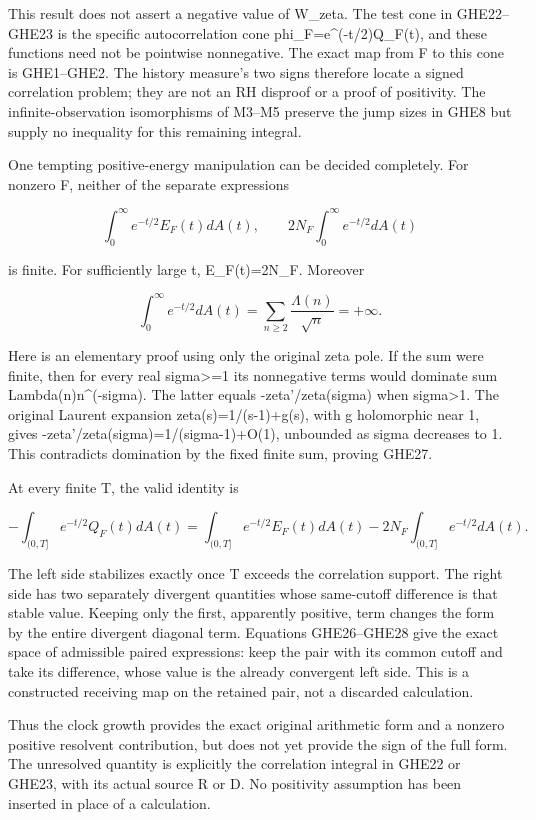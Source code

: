 This result does not assert a negative value of W\_zeta. The test cone
in GHE22--GHE23 is the specific autocorrelation cone
phi\_F=e\^{}(-t/2)Q\_F(t), and these functions need not be pointwise
nonnegative. The exact map from F to this cone is GHE1--GHE2. The
history measure's two signs therefore locate a signed correlation
problem; they are not an RH disproof or a proof of positivity. The
infinite-observation isomorphisms of M3--M5 preserve the jump sizes in
GHE8 but supply no inequality for this remaining integral.

One tempting positive-energy manipulation can be decided completely. For
nonzero F, neither of the separate expressions

\[
\int_0^\infty e^{-t/2}E_F(t)dA(t),\qquad
2N_F\int_0^\infty e^{-t/2}dA(t)
\tag{GHE26}
\]

is finite. For sufficiently large t, E\_F(t)=2N\_F. Moreover

\[
\int_0^\infty e^{-t/2}dA(t)
=\sum_{n\ge2}\frac{\Lambda(n)}{\sqrt n}=+\infty.
\tag{GHE27}
\]

Here is an elementary proof using only the original zeta pole. If the
sum were finite, then for every real sigma\textgreater=1 its nonnegative
terms would dominate sum Lambda(n)n\^{}(-sigma). The latter equals
-zeta'/zeta(sigma) when sigma\textgreater1. The original Laurent
expansion zeta(s)=1/(s-1)+g(s), with g holomorphic near 1, gives
-zeta'/zeta(sigma)=1/(sigma-1)+O(1), unbounded as sigma decreases to 1.
This contradicts domination by the fixed finite sum, proving GHE27.

At every finite T, the valid identity is

\[
-\int_{(0,T]}e^{-t/2}Q_F(t)dA(t)
=\int_{(0,T]}e^{-t/2}E_F(t)dA(t)
-2N_F\int_{(0,T]}e^{-t/2}dA(t).
\tag{GHE28}
\]

The left side stabilizes exactly once T exceeds the correlation support.
The right side has two separately divergent quantities whose same-cutoff
difference is that stable value. Keeping only the first, apparently
positive, term changes the form by the entire divergent diagonal term.
Equations GHE26--GHE28 give the exact space of admissible paired
expressions: keep the pair with its common cutoff and take its
difference, whose value is the already convergent left side. This is a
constructed receiving map on the retained pair, not a discarded
calculation.

Thus the clock growth provides the exact original arithmetic form and a
nonzero positive resolvent contribution, but does not yet provide the
sign of the full form. The unresolved quantity is explicitly the
correlation integral in GHE22 or GHE23, with its actual source R or D.
No positivity assumption has been inserted in place of a calculation.

